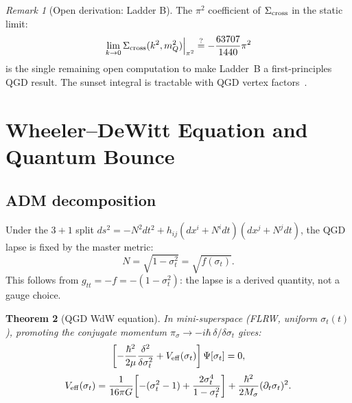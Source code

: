 \documentclass[11pt,a4paper]{article}
\theoremstyle{plain}
\newtheorem{theorem}{Theorem}[section]
\theoremstyle{definition}
\theoremstyle{remark}
\newtheorem{remark}[theorem]{Remark}
\newcommand{\mQ}{m_Q}
\newcommand{\sigt}{\sigma_t}
\begin{document}
\begin{remark}[Open derivation: Ladder B]
The $\pi^2$ coefficient of $\Sigma_{\rm cross}$ in the static limit:
\begin{equation}
  \lim_{k\to0}\Sigma_{\rm cross}(k^2,\mQ^2)\Big|_{\pi^2}
  \stackrel{?}{=} -\frac{63707}{1440}\pi^2
  \label{eq:LadderB}
\end{equation}
is the single remaining open computation to make Ladder~B a
first-principles QGD result.  The sunset integral is tractable
with QGD vertex factors~\cite{DT93}.
\end{remark}

\section{Wheeler--DeWitt Equation and Quantum Bounce}
\label{sec:WdW}

\subsection{ADM decomposition}

Under the $3+1$ split $ds^2=-N^2dt^2+h_{ij}(dx^i+N^idt)(dx^j+N^jdt)$,
the QGD lapse is fixed by the master metric:
\begin{equation}
  N = \sqrt{1-\sigt^2} = \sqrt{f(\sigma_t)}.
  \label{eq:lapse}
\end{equation}
This follows from $g_{tt}=-f = -(1-\sigt^2)$: the lapse is a
derived quantity, not a gauge choice.

\begin{theorem}[QGD WdW equation]\label{thm:WdW}
In mini-superspace (FLRW, uniform $\sigt(t)$), promoting the conjugate
momentum $\pi_\sigma\to-i\hbar\,\delta/\delta\sigt$ gives:
\begin{equation}
  \left[-\frac{\hbar^2}{2\mu}\frac{\delta^2}{\delta\sigt^2}
    + V_{\rm eff}(\sigt)\right]\Psi[\sigt] = 0,
  \label{eq:WdW}
\end{equation}
\begin{equation}
  V_{\rm eff}(\sigt) = \frac{1}{16\pi G}\!\left[
    -(\sigt^2-1) + \frac{2\sigt^4}{1-\sigt^2}
  \right] + \frac{\hbar^2}{2M_\sigma}(\partial_t\sigt)^2.
  \label{eq:Veff}
\end{equation}
\end{theorem}
\end{document}
